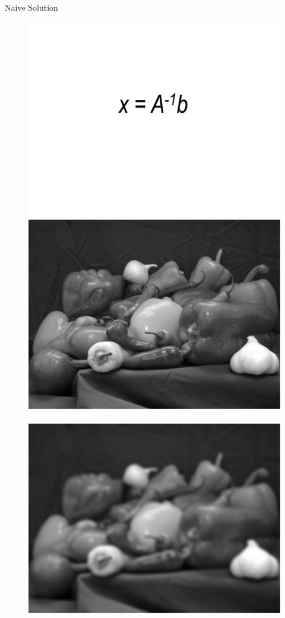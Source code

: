 \documentclass[12pt]{beamer}
\begin{document}
\begin{frame}{Naive Solution}
\begin{figure}
\centering
\includegraphics[scale=0.4]{../figures/naive1} \\[2ex]
\includegraphics[scale=0.2]{../figures/fig1} \,
\includegraphics[scale=0.2]{../figures/fig2} \,

\end{figure}
\end{frame}
\end{document}
